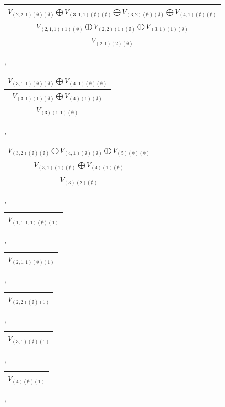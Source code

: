 \documentclass[letterpaper,11pt]{article}
\begin{document}
	\newline 
	\begin{tabular}{| c |}
		\hline
		$V_{(2,2,1)(\emptyset)(\emptyset)}$$\bigoplus$$V_{(3,1,1)(\emptyset)(\emptyset)}$$\bigoplus$$V_{(3,2)(\emptyset)(\emptyset)}$$\bigoplus$$V_{(4,1)(\emptyset)(\emptyset)}$\\
		\hline
		$V_{(2,1,1)(1)(\emptyset)}$$\bigoplus$$V_{(2,2)(1)(\emptyset)}$$\bigoplus$$V_{(3,1)(1)(\emptyset)}$\\
		\hline
		$V_{(2,1)(2)(\emptyset)}$\\
		\hline
	\end{tabular}, 
	\begin{tabular}{| c |}
		\hline
		$V_{(3,1,1)(\emptyset)(\emptyset)}$$\bigoplus$$V_{(4,1)(\emptyset)(\emptyset)}$\\
		\hline
		$V_{(3,1)(1)(\emptyset)}$$\bigoplus$$V_{(4)(1)(\emptyset)}$\\
		\hline
		$V_{(3)(1,1)(\emptyset)}$\\
		\hline
	\end{tabular}, 
	\newline 
	\begin{tabular}{| c |}
		\hline
		$V_{(3,2)(\emptyset)(\emptyset)}$$\bigoplus$$V_{(4,1)(\emptyset)(\emptyset)}$$\bigoplus$$V_{(5)(\emptyset)(\emptyset)}$\\
		\hline
		$V_{(3,1)(1)(\emptyset)}$$\bigoplus$$V_{(4)(1)(\emptyset)}$\\
		\hline
		$V_{(3)(2)(\emptyset)}$\\
		\hline
	\end{tabular}, 
	\begin{tabular}{| c |}
		\hline
		$V_{(1,1,1,1)(\emptyset)(1)}$\\
		\hline
	\end{tabular}, 
	\begin{tabular}{| c |}
		\hline
		$V_{(2,1,1)(\emptyset)(1)}$\\
		\hline
	\end{tabular}, 
	\begin{tabular}{| c |}
		\hline
		$V_{(2,2)(\emptyset)(1)}$\\
		\hline
	\end{tabular}, 
	\begin{tabular}{| c |}
		\hline
		$V_{(3,1)(\emptyset)(1)}$\\
		\hline
	\end{tabular}, 
	\begin{tabular}{| c |}
		\hline
		$V_{(4)(\emptyset)(1)}$\\
		\hline
	\end{tabular}, 
\end{document}
